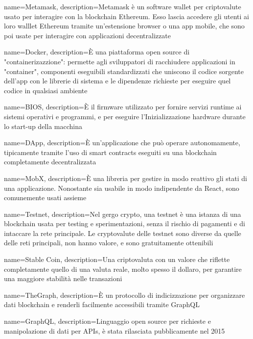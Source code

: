 {
  name={Metamask},
  description={Metamask è un software wallet per criptovalute usato per interagire con la blockchain Ethereum. Esso lascia accedere gli utenti ai loro walllet Ethereum tramite un'estensione browser o una app mobile, che sono poi usate per interagire con applicazioni decentralizzate}
}

{
  name={Docker},
  description={È una piattaforma open source di "containerizazzione": permette agli sviluppatori di racchiudere applicazioni in "container", componenti eseguibili standardizzati che uniscono il codice sorgente dell'app con le librerie di sistema e le dipendenze richieste per eseguire quel codice in qualsiasi ambiente}
}

{
  name={BIOS},
  description={È il firmware utilizzato per fornire servizi runtime ai sistemi operativi e programmi, e per eseguire l'Inizializzazione hardware durante lo start-up della macchina}
}

{
  name={DApp},
  description={È un'applicazione che può operare autonomamente, tipicamente tramite l'uso di smart contracts eseguiti su una blockchain completamente decentralizzata}
}

{
  name={MobX},
  description={È una libreria per gestire in modo reattivo gli stati di una applicazione. Nonostante sia usabile in modo indipendente da React, sono comunemente usati assieme}
}

{
  name={Testnet},
  description={Nel gergo crypto, una testnet è una istanza di una blockchain usata per testing e sperimentazioni, senza il rischio di pagamenti e di intaccare la rete principale. Le cryptovalute delle testnet sono diverse da quelle delle reti principali, non hanno valore, e sono gratuitamente ottenibili}
}

{
  name={Stable Coin},
  description={Una criptovaluta con un valore che riflette completamente quello di una valuta reale, molto spesso il dollaro, per garantire una maggiore stabilità nelle transazioni}
}

{
  name={TheGraph},
  description={È un protocollo di indicizzazione per organizzare dati blockchain e renderli facilmente accessibili tramite GraphQL\glo}
}

{
  name={GraphQL},
  description={Linguaggio open source per richieste e manipolazione di dati per APIs\glo{}, è stata rilasciata pubblicamente nel 2015}
}

